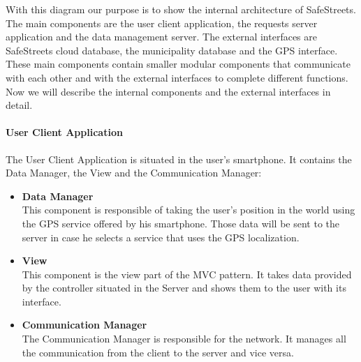\documentclass[titlepage]{article}
\begin{document}
With this diagram our purpose is to show the internal architecture of SafeStreets. \\
The main components are the user client application, the requests server application and the data management server. The external interfaces are SafeStreets cloud database, the municipality database and the GPS interface.\\
These main components contain smaller modular components that communicate with each other and with the external interfaces to complete different functions.\\
Now we will describe the internal components and the external interfaces in detail. \\

\paragraph{\textbf{User Client Application}}
The User Client Application is situated in the user's smartphone. It contains the Data Manager, the View and the Communication Manager:
\begin{itemize}
\item \textbf{Data Manager}\\
This component is responsible of taking the user's position in the world using the GPS service offered by his smartphone. Those data will be sent to the server in case he selects a service that uses the GPS localization. \\
\item \textbf{View}\\
This component is the view part of the MVC pattern. It takes data provided by the controller situated in the Server and shows them to the user with its interface.
\item \textbf{Communication Manager}\\
The Communication Manager is responsible for the network.
It manages all the communication from the client to the server and vice versa.\\
\end{itemize}
\end{document}
